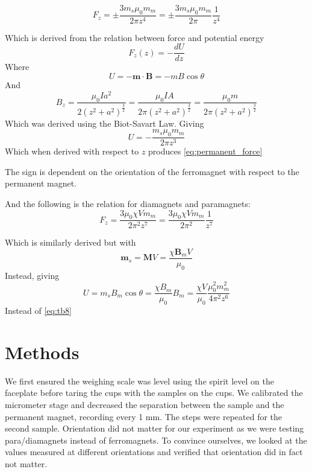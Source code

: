 \documentclass[12pt]{article}
\begin{document}
\begin{equation} \label{eq:permanent_force}
    F_z = \pm \frac{3 m_s \mu_0 m_m}{2 \pi z^4} = \pm \frac{3 m_s \mu_0 m_m}{2 \pi} \frac{1}{z^4}
\end{equation}

Which is derived from the relation between force and potential energy
\begin{equation}
    F_z(z) = -\frac{dU}{dz}
\end{equation}
Where
\begin{equation}
    U = -\mathbf{m} \cdot \mathbf{B} = -mB\cos\theta
\end{equation}
And
\begin{equation}
    B_z = \frac{\mu_0 I a^2}{2(z^2+a^2)^\frac{3}{2}} = \frac{\mu_0 I A}{2\pi(z^2+a^2)^\frac{3}{2}} = \frac{\mu_0 m}{2\pi(z^2+a^2)^\frac{3}{2}}
\end{equation}
Which was derived using the Biot-Savart Law.
Giving
\begin{equation}\label{eq:tb8}
    U = -\frac{m_s \mu_0 m_m}{2\pi z^3}
\end{equation}
Which when derived with respect to $z$ produces \ref{eq:permanent_force}

The sign is dependent on the orientation of the ferromagnet with respect to the permanent magnet.

And the following is the relation for diamagnets and paramagnets:
\begin{equation} \label{eq:para_force}
    F_z = \frac{3 \mu_0 \chi V m_m}{2 \pi^2 z^7} = \frac{3 \mu_0 \chi V m_m}{2 \pi^2} \frac{1}{z^7}
\end{equation}

Which is similarly derived but with
\begin{equation}
    \mathbf{m}_s=\mathbf{M}V=\frac{\chi\mathbf{B}_mV}{\mu_0}
\end{equation}
Instead, giving
\begin{equation}
    U=m_s B_m \cos \theta=\frac{\chi B_m}{\mu_0}B_m = \frac{\chi V}{\mu_0}\frac{\mu_0 ^2 m_m^2}{4\pi^2z^6}
\end{equation}
Instead of \ref{eq:tb8}

\section{Methods}

We first ensured the weighing scale was level using the spirit level on the faceplate before taring the cups with the samples on the cups. We calibrated the micrometer stage and decreased the separation between the sample and the permanent magnet, recording every 1 mm. The steps were repeated for the second sample. Orientation did not matter for our experiment as we were testing para/diamagnets instead of ferromagnets. To convince ourselves, we looked at the values measured at different orientations and verified that orientation did in fact not matter.
\end{document}
